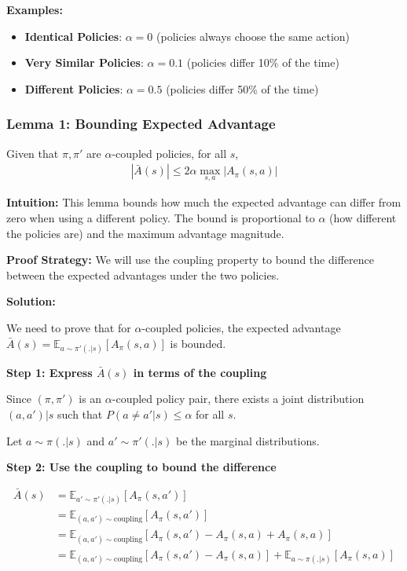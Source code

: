\textbf{Examples:}
\begin{itemize}
    \item \textbf{Identical Policies}: $\alpha = 0$ (policies always choose the same action)
    \item \textbf{Very Similar Policies}: $\alpha = 0.1$ (policies differ 10\% of the time)
    \item \textbf{Different Policies}: $\alpha = 0.5$ (policies differ 50\% of the time)
\end{itemize}

\subsubsection{Lemma 1: Bounding Expected Advantage}

\begin{lemma}
    Given that $\pi, \pi'$ are $\alpha$-coupled policies, for all $s$,
    \begin{align*}
        |\bar{A}(s)| \le 2\alpha \max_{s, a}|A_{\pi}(s,a)|
    \end{align*}
\end{lemma}

\textbf{Intuition:}
This lemma bounds how much the expected advantage can differ from zero when using a different policy. The bound is proportional to $\alpha$ (how different the policies are) and the maximum advantage magnitude.

\textbf{Proof Strategy:}
We will use the coupling property to bound the difference between the expected advantages under the two policies.

\textbf{Solution:}

We need to prove that for $\alpha$-coupled policies, the expected advantage $\bar{A}(s) = \mathbb{E}_{a \sim \pi'(.|s)}[A_{\pi}(s, a)]$ is bounded.

\textbf{Step 1: Express $\bar{A}(s)$ in terms of the coupling}

Since $(\pi, \pi')$ is an $\alpha$-coupled policy pair, there exists a joint distribution $(a, a')|s$ such that $P(a \neq a'|s) \le \alpha$ for all $s$.

Let $a \sim \pi(.|s)$ and $a' \sim \pi'(.|s)$ be the marginal distributions.

\textbf{Step 2: Use the coupling to bound the difference}

\begin{align}
\bar{A}(s) &= \mathbb{E}_{a' \sim \pi'(.|s)}[A_{\pi}(s, a')] \\
&= \mathbb{E}_{(a,a') \sim \text{coupling}}[A_{\pi}(s, a')] \\
&= \mathbb{E}_{(a,a') \sim \text{coupling}}[A_{\pi}(s, a') - A_{\pi}(s, a) + A_{\pi}(s, a)] \\
&= \mathbb{E}_{(a,a') \sim \text{coupling}}[A_{\pi}(s, a') - A_{\pi}(s, a)] + \mathbb{E}_{a \sim \pi(.|s)}[A_{\pi}(s, a)]
\end{align}

